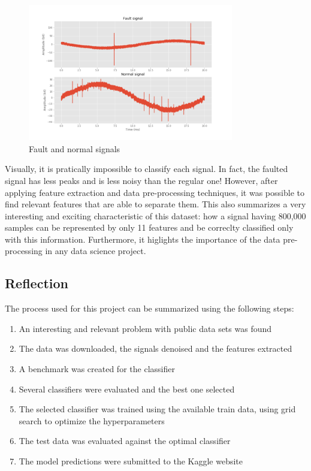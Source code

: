 \documentclass[11pt]{article}
\providecommand{\tightlist}{%
      \setlength{\itemsep}{0pt}\setlength{\parskip}{0pt}}
\begin{document}
\begin{figure}[h]
\centering
\includegraphics[width=0.8\textwidth]{signal_fault_normal_raw_freeform.png}
\caption{Fault and normal signals}
\label{fig:free_form_pd}
\end{figure}

Visually, it is pratically impossible to classify each signal. In fact,
the faulted signal has less peaks and is less noisy than the regular
one! However, after applying feature extraction and data pre-processing
techniques, it was possible to find relevant features that are able to
separate them. This also summarizes a very interesting and exciting
characteristic of this dataset: how a signal having 800,000 samples can
be represented by only 11 features and be correclty classified only with
this information. Furthermore, it higlights the importance of the data
pre-processing in any data science project.

\hypertarget{reflection}{%
\subsection{Reflection}\label{reflection}}

The process used for this project can be summarized using the following
steps:

\begin{enumerate}
\def\labelenumi{\arabic{enumi}.}
\tightlist
\item
  An interesting and relevant problem with public data sets was found
\item
  The data was downloaded, the signals denoised and the features
  extracted
\item
  A benchmark was created for the classifier
\item
  Several classifiers were evaluated and the best one selected
\item
  The selected classifier was trained using the available train data,
  using grid search to optimize the hyperparameters
\item
  The test data was evaluated against the optimal classifier
\item
  The model predictions were submitted to the Kaggle website
\end{enumerate}
\end{document}
